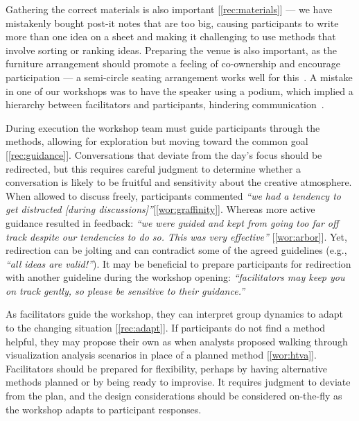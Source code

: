 Gathering the correct materials is also important [\ref{rec:materials}] --- we have mistakenly bought post-it notes that are too big, causing participants to write more than one idea on a sheet and making it challenging to use methods that involve sorting or ranking ideas. Preparing the venue is also important, as the furniture arrangement should promote a feeling of co-ownership and encourage participation --- a semi-circle seating arrangement works well for this~\cite{Vosko1991}. A mistake in one of our workshops was to have the speaker using a podium, which implied a hierarchy between facilitators and participants, hindering communication~\cite{Rogers2016}.

During execution the workshop team must guide participants through the methods, allowing for exploration but moving toward the common goal [\ref{rec:guidance}]. Conversations that deviate from the day's focus should be redirected, but this requires careful judgment to determine whether a conversation is likely to be fruitful and sensitivity about the creative atmosphere. When allowed to discuss freely, participants commented \emph{``we had a tendency to get distracted [during discussions]''}[\ref{wor:graffinity}]. Whereas more active guidance resulted in feedback: \emph{``we were guided and kept from going too far off track despite our tendencies to do so. This was very effective''} [\ref{wor:arbor}]. Yet, redirection can be jolting and can contradict some of the agreed guidelines (e.g., \emph{``all ideas are valid!''}). It may be beneficial to prepare participants for redirection with another guideline during the workshop opening: \emph{``facilitators may keep you on track gently, so please be sensitive to their guidance.''}

As facilitators guide the workshop, they can interpret group dynamics to adapt to the changing situation [\ref{rec:adapt}]. If participants do not find a method helpful, they may propose their own as when analysts proposed walking through visualization analysis scenarios in place of a planned method [\ref{wor:htva}]. Facilitators should be prepared for flexibility, perhaps by having alternative methods planned or by being ready to improvise. It requires judgment to deviate from the plan, and the design considerations should be considered on-the-fly as the workshop adapts to participant responses.


